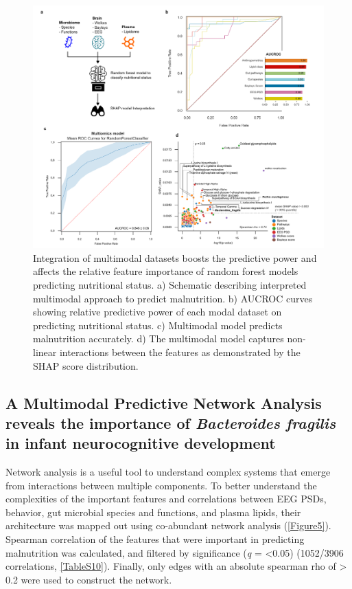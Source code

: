 \documentclass{article}
\begin{document}
\begin{figure}[!htb]
\centering
\includegraphics[scale=0.9]{../../figures/Figure4-ai.pdf}
\caption[Integration of multimodal datasets boosts the predictive power and affects the relative feature importance of random forest models predicting nutritional status]{
	Integration of multimodal datasets boosts the predictive power and affects the relative feature importance of random forest models predicting nutritional status.
	a) Schematic describing interpreted multimodal approach to predict malnutrition.
	b) AUCROC curves showing relative predictive power of each modal dataset on predicting nutritional status.
	c) Multimodal model predicts malnutrition accurately.
	d) The multimodal model captures non-linear interactions between the features as demonstrated by the SHAP score distribution.}
\label{Figure4}
\end{figure}

\subsection*{A Multimodal Predictive Network Analysis reveals the importance of \textit{Bacteroides fragilis} in infant neurocognitive development}
Network analysis is a useful tool to understand complex systems that emerge from interactions between multiple components.
To better understand the complexities of the important features and correlations between EEG PSDs, behavior, gut microbial species and functions, and plasma lipids, their architecture was mapped out using co-abundant network analysis (\autoref{Figure5}).
Spearman correlation of the features that were important in predicting malnutrition was calculated, and filtered by significance (\textit{q} = \textless{}0.05) (1052/3906 correlations,  \autoref{TableS10}).
Finally, only edges with an absolute spearman rho of \textgreater{} 0.2 were used to construct the network.
\end{document}
